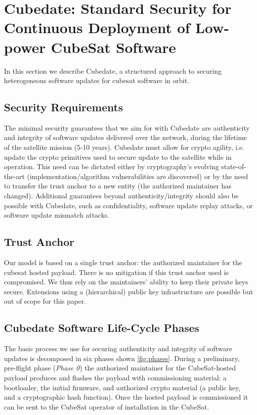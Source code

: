 \section{Cubedate: Standard Security for Continuous Deployment of Low-power CubeSat Software}
\label{sec:low-power-orbital-communication-arch}

In this section we describe Cubedate, a structured approach to securing heterogeneous software updates for cubesat software in orbit.

\subsection{Security Requirements}
The minimal security guarantees that we aim for with Cubedate are authenticity and integrity of software updates delivered over the network, during the lifetime of the satellite mission (5-10 years).
Cubedate must allow for crypto agility, i.e. update the crypto primitives used to secure update to the satellite while in operation. This need can be dictated either by cryptography's evolving state-of-the-art (implementation/algorithm vulnerabilities are discovered) or by the need to transfer the trust anchor to a new entity (the authorized maintainer has changed).
Additional guarantees beyond authenticity/integrity should also be possible with Cubedate, such as confidentiality, software update replay attacks, or software update mismatch attacks.

\subsection{Trust Anchor}
Our model is based on a single trust anchor: the authorized maintainer for the cubesat hosted payload.
There is no mitigation if this trust anchor used is compromised. 
We thus rely on the maintainers' ability to keep their private keys secure. 
Extensions using a (hierarchical) public key infrastructure are possible but out of scope for this paper.

\subsection{Cubedate Software Life-Cycle Phases}
The basic process we use for securing authenticity and integrity of software updates is decomposed in six phases shown \autoref{fig:phases}. During a preliminary, pre-flight phase (\textit{Phase 0}) the authorized maintainer for the CubeSat-hosted payload
produces and flashes the payload with commissioning material:
a bootloader, the initial firmware, and authorized crypto material (a public key, and a cryptographic hash function).
Once the hosted payload is commissioned it can be sent to the CubeSat operator of installation in the CubeSat.

